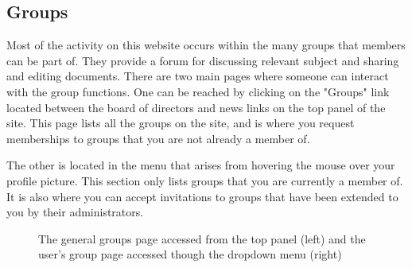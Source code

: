 \documentclass[10pt]{article}
\begin{document}
\subsection{Groups}
\begin{flushleft}
Most of the activity on this website occurs within the many groups that members can be part of.  They provide a forum for discussing relevant subject and sharing and editing documents.  There are two main pages where someone can interact with the group functions.  One can be reached by clicking on the "Groups" link located between the board of directors and news links on the top panel of the site.  This page lists all the groups on the site, and is where you request memberships to groups that you are not already a member of. 
\end{flushleft}

\begin{flushleft}
The other is located in the menu that arises from hovering the mouse over your profile picture. This section only lists groups that you are currently a member of.  It is also where you can accept invitations to groups that have been extended to you by their administrators. 
\end{flushleft}

\begin{figure}[h]
    \centering
    \qquad
    \caption{The general groups page accessed from the top panel (left) and the user's group page accessed though the dropdown menu (right)}
    \label{groupmenus}
\end{figure}
\end{document}
